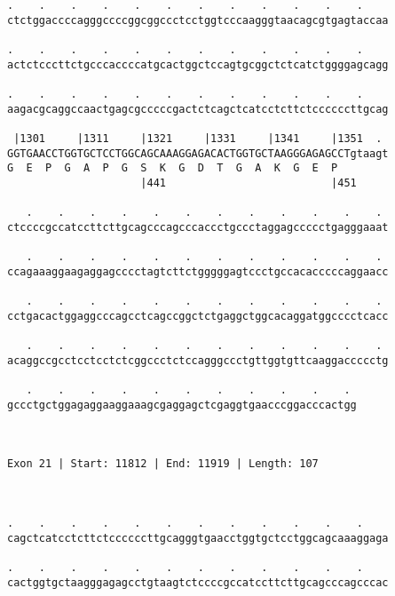 \documentclass{article}
\begin{document}
\begin{Verbatim}
.    .    .    .    .    .    .    .    .    .    .    .    
ctctggaccccagggccccggcggccctcctggtcccaagggtaacagcgtgagtaccaa
                                                            
.    .    .    .    .    .    .    .    .    .    .    .    
actctcccttctgcccaccccatgcactggctccagtgcggctctcatctggggagcagg
                                                            
.    .    .    .    .    .    .    .    .    .    .    .    
aagacgcaggccaactgagcgcccccgactctcagctcatcctcttctccccccttgcag
                                                            
 |1301     |1311     |1321     |1331     |1341     |1351  . 
GGTGAACCTGGTGCTCCTGGCAGCAAAGGAGACACTGGTGCTAAGGGAGAGCCTgtaagt
G  E  P  G  A  P  G  S  K  G  D  T  G  A  K  G  E  P        
                     |441                          |451     
  
   .    .    .    .    .    .    .    .    .    .    .    . 
ctccccgccatccttcttgcagcccagcccaccctgccctaggagccccctgagggaaat
                                                            
   .    .    .    .    .    .    .    .    .    .    .    . 
ccagaaaggaagaggagcccctagtcttctgggggagtccctgccacacccccaggaacc
                                                            
   .    .    .    .    .    .    .    .    .    .    .    . 
cctgacactggaggcccagcctcagccggctctgaggctggcacaggatggcccctcacc
                                                            
   .    .    .    .    .    .    .    .    .    .    .    . 
acaggccgcctcctcctctcggccctctccagggccctgttggtgttcaaggaccccctg
                                                            
   .    .    .    .    .    .    .    .    .    .    . 
gccctgctggagaggaaggaaagcgaggagctcgaggtgaacccggacccactgg
                                                       
                                                       
 
Exon 21 | Start: 11812 | End: 11919 | Length: 107



.    .    .    .    .    .    .    .    .    .    .    .    
cagctcatcctcttctccccccttgcagggtgaacctggtgctcctggcagcaaaggaga
                                                            
.    .    .    .    .    .    .    .    .    .    .    .    
cactggtgctaagggagagcctgtaagtctccccgccatccttcttgcagcccagcccac
                                                            

\end{Verbatim}
\end{document}
